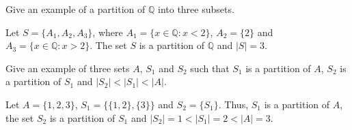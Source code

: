 \documentclass[12pt]{article}
\newcommand{\Q}{\mathbb{Q}}
\newenvironment{problem}[2][Problem]{\begin{trivlist}
		\item[\hskip \labelsep {\bfseries #1}\hskip \labelsep {\bfseries #2.}]}{\end{trivlist}}
\newenvironment{solution}[2][Solution]{\begin{trivlist}
		\item[\hskip \labelsep {\bfseries #1}\hskip \labelsep {\bfseries #2.}]}{\end{trivlist}}
\begin{document}
\begin{problem}{51}
	Give an example of a partition of $\Q$ into three subsets.
	\begin{solution}{}
		Let $S=\{A_{1},A_{2},A_{3}\}$, where $A_{1} = \{x\in \Q: x < 2\}$, $A_{2}=\{2\}$ and $A_{3} = \{x\in \Q: x > 2\}$. The set $S$ is a partition of $\Q$ and $|S|=3$.
	\end{solution}
\end{problem}

\begin{problem}{52}
	Give an example of three sets $A$, $S_{1}$ and $S_{2}$ such that $S_{1}$ is a partition of $A$, $S_{2}$ is a partition of $S_{1}$ and $|S_{2}|<|S_{1}|<|A|$.
	\begin{solution}{}
		Let $A=\{1,2,3\}$, $S_{1} = \{\{1,2\},\{3\}\}$ and $S_{2} = \{S_{1}\}$. Thus, $S_{1}$ is a partition of $A$, the set $S_{2}$ is a partition of $S_{1}$ and $|S_{2}|=1<|S_{1}|=2<|A|=3$.
	\end{solution}
\end{problem}

\begin{problem}{53}
	
\end{problem}

\begin{problem}{54}
	
\end{problem}
\end{document}
